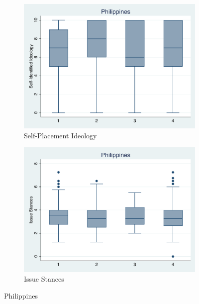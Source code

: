 \documentclass[12pt, titlepage]{article}
\begin{document}
\begin{figure}[H]
	\centering
	\begin{subfigure}[b]{0.475\textwidth}   
		\centering 
		\includegraphics[width=\textwidth]{IdeoBP/Philippines}
		\caption{Self-Placement Ideology}
	\end{subfigure}
	\hfill
	\begin{subfigure}[b]{0.475\textwidth}
		\centering 
		\includegraphics[width=\textwidth]{BoxLib/Philipines}
		\caption{Issue Stances}
	\end{subfigure}
	\caption{Philippines}
	\label{Philippines}
\end{figure}
\end{document}
